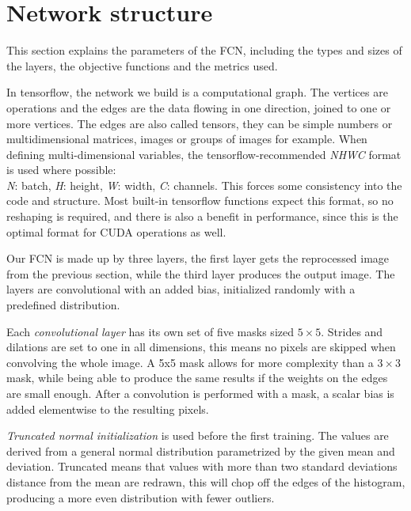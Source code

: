 \documentclass[12pt]{report}
\begin{document}
\section{Network structure}
This section explains the parameters of the FCN, including the types and sizes of the layers, the objective functions and the metrics used.\par

In tensorflow, the network we build is a computational graph. The vertices are operations and the edges are the data flowing in one direction, joined to one or more vertices. The edges are also called tensors, they can be simple numbers or multidimensional matrices, images or groups of images for example.
When defining multi-dimensional variables, the tensorflow-recommended \textit{NHWC} format is used where possible:\\
 \textit{N}: batch, \textit{H}: height, \textit{W}: width, \textit{C}: channels. This forces some consistency into the code and structure. Most built-in tensorflow functions expect this format, so no reshaping is required, and there is also a benefit in performance, since this is the optimal format for CUDA operations as well.\par
 
Our FCN is made up by three layers, the first layer gets the reprocessed image from the previous section, while the third layer produces the output image. The layers are convolutional with an added bias, initialized randomly with a predefined distribution.\par

Each \textit{convolutional layer} has its own set of five masks sized $5×5$. Strides and dilations are set to one in all dimensions, this means no pixels are skipped when convolving the whole image. A 5x5 mask allows for more complexity than a $3×3$ mask, while being able to produce the same results if the weights on the edges are small enough. After a convolution is performed with a mask, a scalar bias is added elementwise to the resulting pixels.\par

\textit{Truncated normal initialization} \cite{trunc} is used before the first training. The values are derived from a general normal distribution parametrized by the given mean and deviation. Truncated means that values with more than two standard deviations distance from the mean are redrawn, this will chop off the edges of the histogram, producing a more even distribution with fewer outliers.\par
\end{document}
